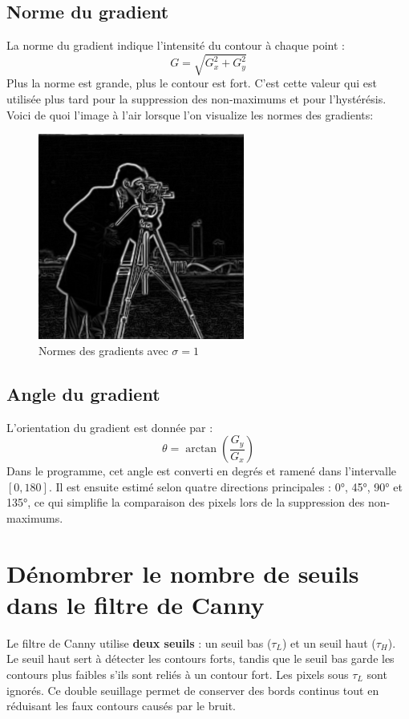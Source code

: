 \documentclass{article}
\begin{document}
\subsection*{Norme du gradient}
La norme du gradient indique l'intensité du contour à chaque point :
\[
G = \sqrt{G_x^2 + G_y^2}
\]
Plus la norme est grande, plus le contour est fort.  
C’est cette valeur qui est utilisée plus tard pour la suppression des non-maximums et pour l’hystérésis.
Voici de quoi l'image à l'air lorsque l'on visualize les normes des gradients:
\begin{figure}[H]
    \centering
    \includegraphics[scale = 0.5]{TpIFT6150-2-gradient.png}
    \caption{Normes des gradients avec $\sigma = 1$}
\end{figure}

\subsection*{Angle du gradient}
L’orientation du gradient est donnée par :
\[
\theta = \arctan{\left(\frac{G_y}{G_x}\right)}
\]
Dans le programme, cet angle est converti en degrés et ramené dans l’intervalle \([0,180]\).  
Il est ensuite estimé selon quatre directions principales : 0°, 45°, 90° et 135°, ce qui simplifie la comparaison des pixels lors de la suppression des non-maximums.

\section*{Dénombrer le nombre de seuils dans le filtre de Canny}

Le filtre de Canny utilise \textbf{deux seuils} : un seuil bas (\(\tau_L\)) et un seuil haut (\(\tau_H\)).  
Le seuil haut sert à détecter les contours forts, tandis que le seuil bas garde les contours plus faibles s’ils sont reliés à un contour fort.  
Les pixels sous \(\tau_L\) sont ignorés.  
Ce double seuillage permet de conserver des bords continus tout en réduisant les faux contours causés par le bruit.
\end{document}
